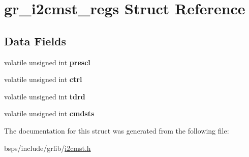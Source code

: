 \hypertarget{structgr__i2cmst__regs}{}\section{gr\+\_\+i2cmst\+\_\+regs Struct Reference}
\label{structgr__i2cmst__regs}
\subsection*{Data Fields}
\begin{DoxyCompactItemize}
\item 
\mbox{\label{structgr__i2cmst__regs_aa815d7af6433bd972ed652eecb2629df}} 
volatile unsigned int {\bfseries prescl}
\item 
\mbox{\label{structgr__i2cmst__regs_ae33ed18892a20b9abe23f809f756ba55}} 
volatile unsigned int {\bfseries ctrl}
\item 
\mbox{\label{structgr__i2cmst__regs_a5d3861e86de6ac74325f2ba8ad12439d}} 
volatile unsigned int {\bfseries tdrd}
\item 
\mbox{\label{structgr__i2cmst__regs_aea6a9bffe89700db46d49dc9be4b6462}} 
volatile unsigned int {\bfseries cmdsts}
\end{DoxyCompactItemize}


The documentation for this struct was generated from the following file\+:\begin{DoxyCompactItemize}
\item 
bsps/include/grlib/\mbox{\hyperlink{i2cmst_8h}{i2cmst.\+h}}\end{DoxyCompactItemize}
